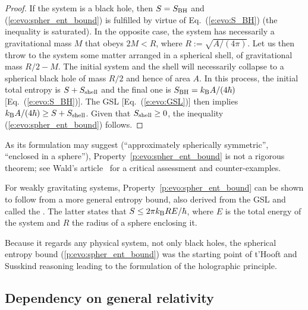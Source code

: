 \begin{proof}
If the system is a black hole, then $S = S_{\rm BH}$ and (\ref{e:evo:spher_ent_bound}) is fulfilled
by virtue of Eq.~(\ref{e:evo:S_BH}) (the inequality is saturated).
In the opposite case, the system has necessarily a gravitational
mass $M$ that obeys $2M < R$, where $R := \sqrt{A/(4\pi)}$. Let us then throw to the system some
matter arranged in a spherical shell, of gravitational mass $R/2 - M$. The initial system and the shell
will necessarily collapse to a spherical black hole of mass $R/2$ and hence of area $A$.
In this process, the initial total entropy is $S + S_{\rm shell}$ and the final one
is $S_{\rm BH} = k_{\rm B} A / (4\hbar)$ [Eq.~(\ref{e:evo:S_BH})]. The GSL [Eq.~(\ref{e:evo:GSL})]
then implies $k_{\rm B} A / (4\hbar) \geq S + S_{\rm shell}$. Given that $S_{\rm shell} \geq 0$,
the inequality (\ref{e:evo:spher_ent_bound}) follows.
\end{proof}

\begin{remark}
As its formulation may suggest (``approximately spherically symmetric'', ``enclosed in a sphere''),
Property~\ref{p:evo:spher_ent_bound} is not a rigorous theorem; see Wald's article~\cite{Wald01}
for a critical assessment and counter-examples.
\end{remark}

\begin{remark}
For weakly gravitating systems, Property~\ref{p:evo:spher_ent_bound} can be shown to follow from
a more general entropy bound, also derived from the GSL and called the   \cite{Beken81}. The latter states that
$S \leq 2\pi k_{\rm B} R E/\hbar$, where $E$ is the total energy of the system and
$R$ the radius of a sphere enclosing it.
\end{remark}

Because it regards any physical system, not only black holes, the
spherical entropy bound (\ref{p:evo:spher_ent_bound})
was the starting point of t'Hooft \cite{tHoof94} and Susskind \cite{Sussk95}
reasoning leading to the formulation of the holographic principle.


\subsection{Dependency on general relativity}

